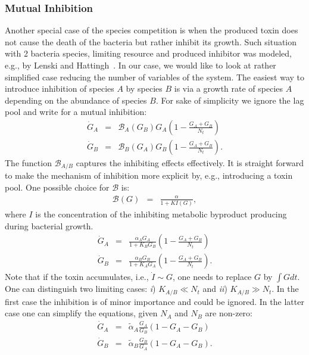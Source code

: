 \documentclass[10pt,A4paper]{article}
\numberwithin{equation}{section}
\begin{document}
\subsubsection{Mutual Inhibition}
Another special case of the species competition is when the produced toxin does not cause the death of the bacteria but rather inhibit its growth.
Such situation with 2 bacteria species, limiting resource and produced inhibitor was modeled, e.g., by Lenski and Hattingh~\cite{lenski_coexistence_1986}.
In our case, we would like to look at rather simplified case reducing the number of variables of the system.
The easiest way to introduce inhibition of species $A$ by species $B$ is via a growth rate of species $A$ depending on the abundance of species $B$.
For sake of simplicity we ignore the lag pool and write for a mutual inhibition:
\begin{eqnarray}
    \dot{G}_A &=& \mathcal{B}_A(G_B)G_A\left(1 - \frac{G_A+G_B}{N_t}\right)\\
    \dot{G}_B &=& \mathcal{B}_B(G_A) G_B\left(1-\frac{G_A+G_B}{N_t}\right).
\label{eq:ode_inhib1}
\end{eqnarray}
The function $\mathcal{B}_{A/B}$ captures the inhibiting effects effectively.
It is straight forward to make the mechanism of inhibition more explicit by, e.g., introducing a toxin pool.
One possible choice for $\mathcal{B}$ is:
\begin{eqnarray}
    \mathcal{B}(G)&=&\frac{\alpha}{1+KI(G)},
\label{eq:ode_inhib_B}
\end{eqnarray}
where $I$ is the concentration of the inhibiting metabolic byproduct producing during bacterial growth.
\begin{eqnarray}
    \dot{G}_A &=& \frac{\alpha_A G_A}{1+K_BG_B}\left(1 - \frac{G_A+G_B}{N_t}\right)\\
    \dot{G}_B &=& \frac{\alpha_B G_B}{1+K_AG_A}\left(1-\frac{G_A+G_B}{N_t}\right).
\label{eq:ode_inhib2}
\end{eqnarray}
Note that if the toxin accumulates, i.e., $\dot I \sim G$,  one needs to replace $G$ by $\int G dt$.
One can distinguish two limiting cases: {\it i}) $K_{A/B}\ll N_t$ and {\it ii}) $K_{A/B}\gg N_t$.
In the first case the inhibition is of minor importance and could be ignored.
In the latter case one can simplify the equations, given $N_A$ and $N_B$ are non-zero:
\begin{eqnarray}
    \dot{G}_A &=&\tilde{\alpha}_A\frac{G_A}{G_B}\left(1 - G_A-G_B\right)\\
    \dot{G}_B &=& \tilde{\alpha}_B\frac{G_B}{G_A}\left(1-G_A-G_B\right).
\label{eq:ode_inhib3}
\end{eqnarray}
\end{document}
